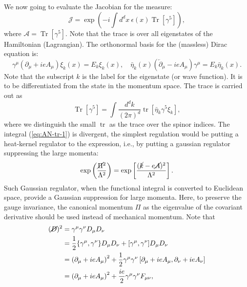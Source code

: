 \documentclass[aps,prb,superscriptaddress,nofootinbib]{revtex4}
\def \tr{\operatorname{tr}}
\def \Tr{\operatorname{Tr}}
\begin{document}
We now going to evaluate the Jacobian for the measure:
\begin{equation}
	\mathcal J = \exp\left(-i \int d^d x \ \epsilon(x) \Tr[\gamma^5] \right),
\end{equation}
where $\mathcal A = \Tr[\gamma^5]$.
Note that the trace is over all eigenstates of the Hamiltonian (Lagrangian).
The orthonormal basis for the (massless) Dirac equation is:
\begin{equation}
	\gamma^\mu (\partial_\mu + ie A_\mu ) \xi_k(x) = E_k \xi_k(x), \quad
	\bar\eta_k(x) \left(\overleftarrow\partial_\mu -ieA_\mu\right) \gamma^\mu = E_k \bar\eta_k(x).
\end{equation}
Note that the subscript $k$ is the label for the eigenstate (or wave function).
It is to be differentiated from the state in the momentum space.
The trace is carried out as
\begin{equation}\label{eq:AN-tr-1}
	\Tr\left[\gamma^5\right] 
	= \int \frac{d^d k}{(2\pi)^d} \tr\left[\bar\eta_k \gamma^5 \xi_k \right],
\end{equation}
where we distinguish the small $\tr$ as the trace over the spinor indices. 
The integral (\ref{eq:AN-tr-1}) is divergent, the simplest regulation would be putting a heat-kernel regulator to the expression, i.e., by putting a gaussian regulator suppressing the large momenta:
\begin{equation}
	\exp\left(\frac{\cancel{\Pi}^2}{\Lambda^2}\right)
	= \exp\left[\frac{(\cancel{k}-e\cancel{A})^2}{\Lambda^2}\right].
\end{equation}
Such Gaussian regulator, when the functional integral is converted to Euclidean space, provide a Gaussian suppression for large momenta.
Here, to preserve the gauge invariance, the canonical momentum $\Pi$ as the eigenvalue of the covariant derivative should be used instead of mechanical momentum. 
Note that
\begin{equation}
\begin{aligned}
	(\cancel D)^2 &= \gamma^\mu \gamma^\nu {D}_\mu {D}_\nu \\
	&= \frac{1}{2} \{\gamma^\mu,\gamma^\nu\} {D}_\mu {D}_\nu + [\gamma^\mu,\gamma^\nu] {D}_\mu {D}_\nu \\
	&= \left(\partial_\mu+ie A_\mu \right)^2 + \frac{1}{2} \gamma^\mu \gamma^\nu \left[\partial_\mu+ie A_\mu, \partial_\nu+ie A_\nu \right] \\
	&= \left(\partial_\mu+ie A_\mu \right)^2 + \frac{ie}{2}\gamma^\mu \gamma^\nu F_{\mu\nu},
\end{aligned}
\end{equation}
\end{document}
